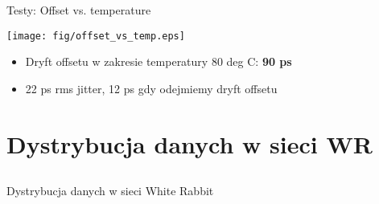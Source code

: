 \documentclass[compress,red]{beamer}
\begin{document}
\begin{frame}{Testy: Offset vs. temperature}

  \begin{center}
    \texttt{[image: fig/offset\_vs\_temp.eps]}
  \end{center}
  \begin{itemize}
    \item Dryft offsetu w zakresie temperatury 80 deg C: \textbf{90 ps}
    \item 22 ps rms jitter, 12 ps gdy odejmiemy dryft offsetu
  \end{itemize}

\end{frame}




\section{Dystrybucja danych w sieci WR}
\subsection{}
\begin{frame}{Dystrybucja danych w sieci White Rabbit}

  \begin{center}
     \color{red}{Deterministyczny i niezawodny transfer danych}
  \end{center}

\end{frame}
\end{document}
